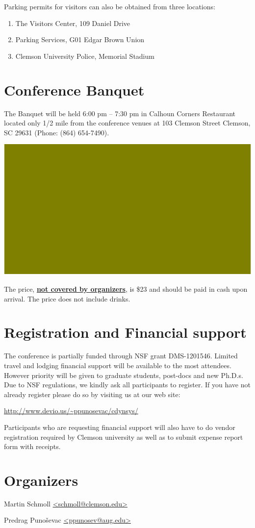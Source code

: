 \documentclass[10pt,foldmark,notumble]{leaflet}
\begin{document}
Parking permits for visitors can also be obtained from three locations:
\begin{enumerate}
\item The Visitors Center, 109 Daniel Drive
\item Parking Services, G01 Edgar Brown Union
\item Clemson University Police, Memorial
Stadium
\end{enumerate}
\section{Conference Banquet}
The Banquet will be held 6:00 pm -- 7:30 pm in Calhoun Corners
Restaurant located only 1/2 mile from the conference venues at
103 Clemson Street
Clemson, SC 29631
(Phone: (864) 654-7490).

\includegraphics[scale=0.72]{restaurant_map.eps}

The price, \underline{\bf not covered by organizers}, is \$23 and should
be paid in cash upon arrival. The price does not include drinks.



\section{Registration and Financial support} The
conference is partially funded through NSF grant DMS-1201546.  Limited
travel and lodging financial support will be available to the most
attendees. However priority will be given to graduate students,
post-docs and new Ph.D.s. Due to NSF regulations, we kindly ask all
participants to register. If you have not already register please do so
by visiting us at our web site:

\url{http://www.devio.us/~ppunosevac/cdynsys/}


Participants who are requesting financial support will also have to do
vendor registration required by Clemson university as well as to submit
expense report form with receipts.

\section{Organizers}

Martin Schmoll \url{<schmoll@clemson.edu>}

Predrag Puno\v{s}evac \url{<ppunosev@aug.edu>}
\end{document}
